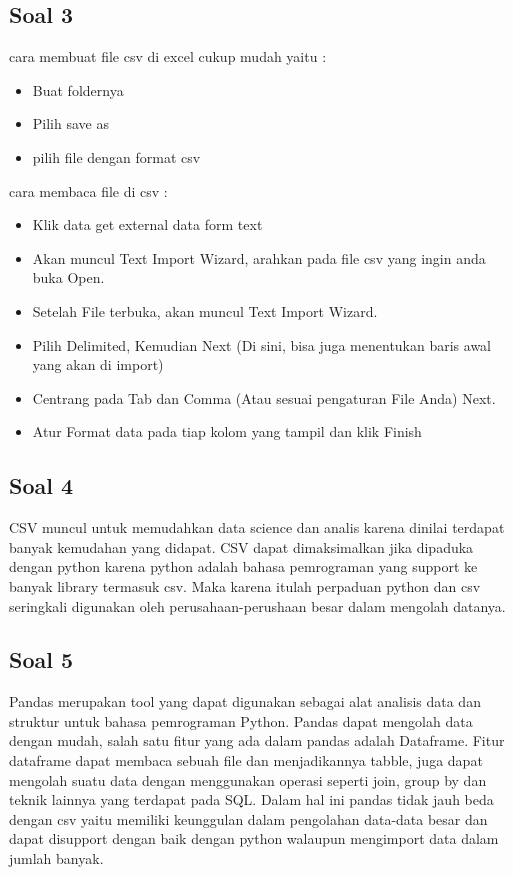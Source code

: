 \subsection{Soal 3}
cara membuat file csv di excel cukup mudah yaitu :
\begin{itemize}
	\item Buat foldernya
	\item Pilih save as
	\item pilih file dengan format csv
\end{itemize}
cara membaca file di csv :
\begin{itemize}
	\item Klik data get external data form text
	\item Akan muncul Text Import Wizard, arahkan pada file csv yang ingin anda buka Open.
	\item Setelah File terbuka, akan muncul Text Import Wizard.
	\item Pilih Delimited, Kemudian Next (Di sini, bisa juga menentukan baris awal yang akan di import)
	\item Centrang pada Tab dan Comma (Atau sesuai pengaturan File Anda) Next.
	\item Atur Format data pada tiap kolom yang tampil dan klik Finish
\end{itemize}
\subsection{Soal 4}
CSV muncul untuk memudahkan data science dan analis karena dinilai terdapat banyak kemudahan yang didapat. CSV dapat dimaksimalkan jika dipaduka dengan python karena python adalah bahasa pemrograman yang support ke banyak library termasuk csv. Maka karena itulah perpaduan python dan csv seringkali digunakan oleh perusahaan-perushaan besar dalam mengolah datanya.
\subsection{Soal 5}
Pandas merupakan tool yang dapat digunakan sebagai alat analisis data dan struktur untuk bahasa pemrograman Python. Pandas dapat mengolah data dengan mudah, salah satu fitur yang ada dalam pandas adalah Dataframe. Fitur dataframe dapat membaca sebuah file dan menjadikannya tabble, juga dapat mengolah suatu data dengan menggunakan operasi seperti join, group by dan teknik lainnya yang terdapat pada SQL. Dalam hal ini pandas tidak jauh beda dengan csv yaitu memiliki keunggulan dalam pengolahan data-data besar dan dapat disupport dengan baik dengan python walaupun mengimport data dalam jumlah banyak.
